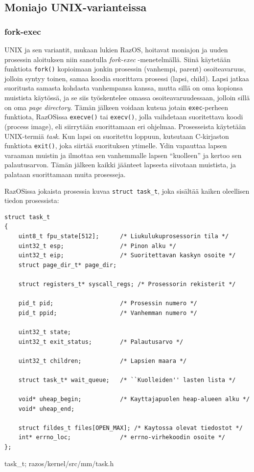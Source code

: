 \subsection{Moniajo UNIX-varianteissa}

\subsubsection{fork-exec}

UNIX ja sen variantit, mukaan lukien RazOS, hoitavat moniajon ja uuden prosessin aloituksen niin sanotulla \textit{fork-exec} -menetelmällä. Siinä käytetään funktiota \texttt{fork()} kopioimaan jonkin prosessin (vanhempi, parent) osoiteavaruus, jolloin syntyy toinen, samaa koodia suorittava prosessi (lapsi, child). Lapsi jatkaa suoritusta samasta kohdasta vanhempansa kanssa, mutta sillä on oma kopionsa muistista käytössä, ja se siis työskentelee omassa osoiteavaruudessaan, jolloin sillä on oma \textit{page directory}. Tämän jälkeen voidaan kutsua jotain \texttt{exec}-perheen funktiota, RazOSissa \texttt{execve()} tai \texttt{execv()}, jolla vaihdetaan suoritettava koodi (process image), eli siirrytään suorittamaan eri ohjelmaa. Prosesseista käytetään UNIX-termiä \textit{task}. Kun lapsi on suoritettu loppuun, kutsutaan C-kirjaston funktiota \texttt{exit()}, joka siirtää suorituksen ytimelle. Ydin vapauttaa lapsen varaaman muistin ja ilmottaa sen vanhemmalle lapsen ``kuolleen'' ja kertoo sen palautusarvon. Tämän jälkeen kaikki jäänteet lapsesta siivotaan muistista, ja palataan suorittamaan muita prosesseja.

\par

RazOSissa jokaista prosessia kuvaa \texttt{struct task\_t}, joka sisältää kaiken oleellisen tiedon prosessista:

\begin{listing}[H]
\begin{verbatim}
struct task_t
{
	uint8_t fpu_state[512];      /* Liukulukuprosessorin tila */
	uint32_t esp;                /* Pinon alku */
	uint32_t eip;                /* Suoritettavan kaskyn osoite */
	struct page_dir_t* page_dir;

	struct registers_t* syscall_regs; /* Prosessorin rekisterit */

	pid_t pid;                   /* Prosessin numero */
	pid_t ppid;                  /* Vanhemman numero */

	uint32_t state;
	uint32_t exit_status;        /* Palautusarvo */

	uint32_t children;           /* Lapsien maara */

	struct task_t* wait_queue;   /* ``Kuolleiden'' lasten lista */

	void* uheap_begin;           /* Kayttajapuolen heap-alueen alku */
	void* uheap_end;

	struct fildes_t files[OPEN_MAX]; /* Kaytossa olevat tiedostot */
	int* errno_loc;              /* errno-virhekoodin osoite */
};
\end{verbatim}
\caption{task\_t; razos/kernel/src/mm/task.h}
\label{lst:task_t}
\end{listing}

